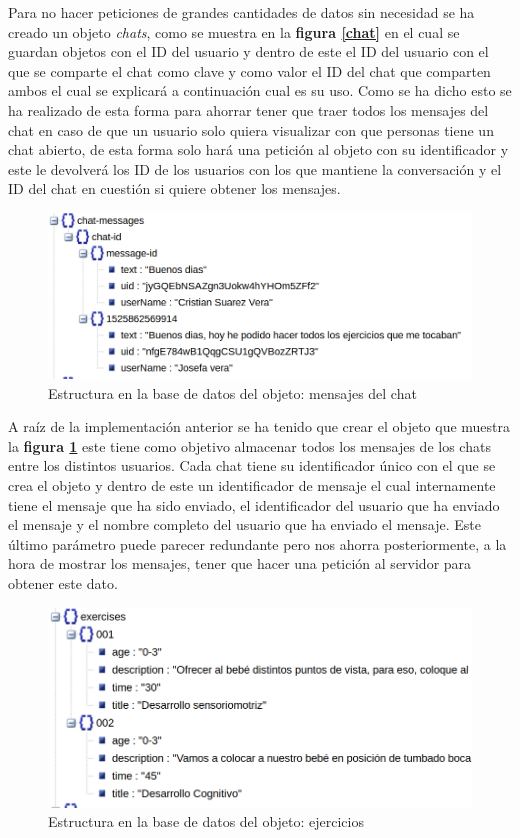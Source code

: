 Para no hacer peticiones de grandes cantidades de datos sin necesidad
se ha creado un objeto \textit{chats}, como se muestra en la
\textbf{figura \ref{chat}} en el cual se guardan
objetos con el ID del usuario y dentro de este el ID del usuario con el
que se comparte el chat como clave y como valor el ID del chat que comparten
ambos el cual se explicará a continuación cual es su uso. Como se ha dicho
esto se ha realizado de esta forma para ahorrar tener que traer todos los
mensajes del chat en caso de que un usuario solo quiera visualizar con
que personas tiene un chat abierto, de esta forma solo hará una petición
al objeto con su identificador y este le devolverá los ID de los usuarios
con los que mantiene la conversación y el ID del chat en cuestión si quiere
obtener los mensajes.

\medskip
\begin{figure}
    \includegraphics[width=\linewidth]{./images/chat-messages-database.png}
    \caption{Estructura en la base de datos del objeto: mensajes del chat}
    \label{mensajes-del-chat}
\end{figure}

A raíz de la implementación anterior se ha tenido que crear el objeto
que muestra la \textbf{figura \ref{mensajes-del-chat}} este tiene como
objetivo almacenar todos los mensajes de los chats entre los distintos
usuarios. Cada chat tiene su identificador único con el que se crea el
objeto y dentro de este un identificador de mensaje el cual internamente
tiene el mensaje que ha sido enviado, el identificador del usuario que
ha enviado el mensaje y el nombre completo del usuario que ha enviado
el mensaje. Este último parámetro puede parecer redundante pero nos
ahorra posteriormente, a la hora de mostrar los mensajes, tener que hacer
una petición al servidor para obtener este dato.

\medskip
\begin{figure}
    \includegraphics[width=\linewidth]{./images/exercises-database.png}
    \caption{Estructura en la base de datos del objeto: ejercicios}
    \label{ejercicios}
\end{figure}

